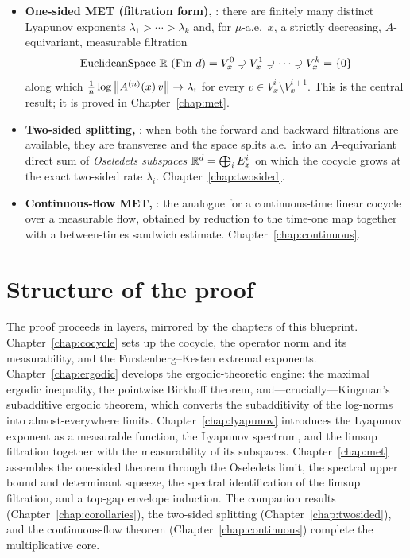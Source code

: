 \begin{itemize}
  \item \textbf{One-sided MET (filtration form),} : there
    are finitely many distinct Lyapunov exponents \(\lambda_1 > \cdots > \lambda_k\) and,
    for \(\mu\)-a.e.\ \(x\), a strictly decreasing, \(A\)-equivariant, measurable filtration
    \[
      \mathrm{EuclideanSpace}\ \mathbb{R}\ (\mathrm{Fin}\ d) = V^0_x \supsetneq V^1_x \supsetneq
      \cdots \supsetneq V^k_x = \{0\}
    \]
    along which \(\tfrac1n \log\left\lVert A^{(n)}(x)\,v \right\rVert \to \lambda_i\) for every
    \(v \in V^i_x \setminus V^{i+1}_x\). This is the central result; it is proved in
    Chapter~\ref{chap:met}.
  \item \textbf{Two-sided splitting,} : when both the
    forward and backward filtrations are available, they are transverse and the space
    splits a.e.\ into an \(A\)-equivariant direct sum of \emph{Oseledets subspaces}
    \(\mathbb{R}^d = \bigoplus_i E^i_x\) on which the cocycle grows at the exact two-sided rate
    \(\lambda_i\). Chapter~\ref{chap:twosided}.
  \item \textbf{Continuous-flow MET,} : the analogue for a
    continuous-time linear cocycle over a measurable flow, obtained by reduction to the
    time-one map together with a between-times sandwich estimate. Chapter~\ref{chap:continuous}.
\end{itemize}

\section{Structure of the proof}

The proof proceeds in layers, mirrored by the chapters of this blueprint.
Chapter~\ref{chap:cocycle} sets up the cocycle, the operator norm and its measurability,
and the Furstenberg--Kesten extremal exponents. Chapter~\ref{chap:ergodic} develops the
ergodic-theoretic engine: the maximal ergodic inequality, the pointwise Birkhoff theorem,
and---crucially---Kingman's subadditive ergodic theorem, which converts the subadditivity
of the log-norms into almost-everywhere limits. Chapter~\ref{chap:lyapunov} introduces the
Lyapunov exponent as a measurable function, the Lyapunov spectrum, and the limsup
filtration together with the measurability of its subspaces. Chapter~\ref{chap:met}
assembles the one-sided theorem through the Oseledets limit, the spectral upper bound and
determinant squeeze, the spectral identification of the limsup filtration, and a top-gap
envelope induction. The companion results (Chapter~\ref{chap:corollaries}), the two-sided
splitting (Chapter~\ref{chap:twosided}), and the continuous-flow theorem
(Chapter~\ref{chap:continuous}) complete the multiplicative core.

